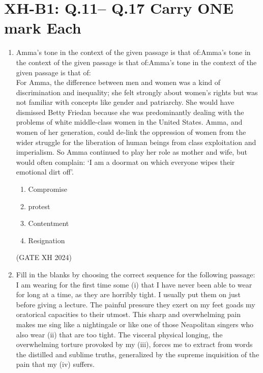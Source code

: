 \documentclass{article}
\begin{document}
\section*{XH-B1: Q.11– Q.17 Carry ONE mark Each}
\begin{enumerate}[leftmargin=*, start=11, label=Q.\arabic*.]
    \item Amma’s tone in the context of the given passage is that of:Amma’s tone in the context of the given passage is that of:Amma’s tone in the context of the given passage is that of: \\ For Amma, the difference between men and women was a kind of discrimination and inequality; she felt strongly about women’s rights but was not familiar with concepts like gender and patriarchy. She would have dismissed Betty Friedan because she was predominantly dealing with the problems of white middle-class women in the United States. Amma, and women of her generation, could de-link the oppression of women from the wider struggle for the liberation of human beings from class exploitation and imperialism. So Amma continued to play her role as mother and wife, but would often complain: ‘I am a doormat on which everyone wipes their emotional dirt off’.
    
    \begin{multicols}{4}
        \begin{enumerate}
            \item Compromise
            \item protest
            \item Contentment
            \item Resignation
        \end{enumerate}
    \end{multicols} \hfill (GATE XH 2024)

    \item Fill in the blanks by choosing the correct sequence for the following passage: \\ I am wearing for the first time some (i)\makebox[1.5cm]{\hrulefill}
    that I have never been able to wear for long at a time, as they are horribly tight. I usually put them on just before giving a lecture. The painful pressure they exert on my feet goads my oratorical capacities to their utmost. This sharp and overwhelming pain makes me sing like a nightingale or like one of those Neapolitan singers who also wear (ii)\makebox[1.5cm]{\hrulefill} that are too tight. The visceral physical longing, the overwhelming torture provoked by my (iii)\makebox[1.5cm]{\hrulefill}, forces me to extract from words the distilled and sublime truths, generalized by the supreme inquisition of the pain that my (iv)\makebox[1.5cm]{\hrulefill} suffers.
    

\end{enumerate}
\end{document}
